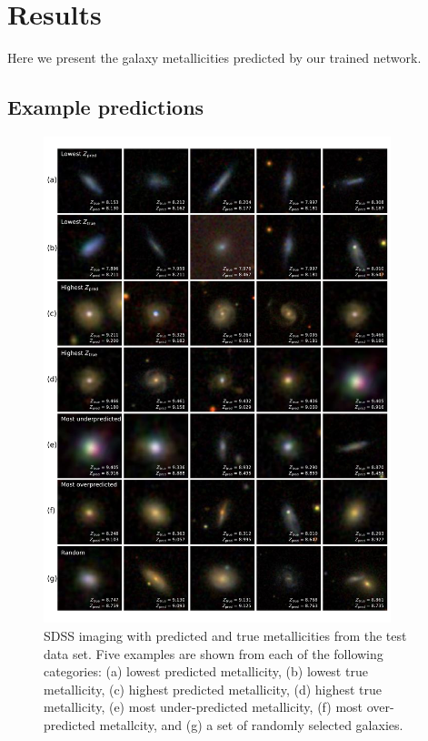 \documentclass[fleqn,usenatbib]{mnras}
\begin{document}
\section{Results}\label{sec:results}
Here we present the galaxy metallicities predicted by our trained network.

\subsection{Example predictions}
\begin{figure}
	\includegraphics[width=0.9\textwidth]{01-prediction_examples.pdf}
	\caption{\label{fig:examples}
		SDSS imaging with predicted and true metallicities from the test data set. Five examples are shown from each of the following categories: (a) lowest predicted metallicity, (b) lowest true metallicity, (c) highest predicted metallicity, (d) highest true metallicity, (e) most under-predicted metallicity, (f) most over-predicted metallcity, and (g) a set of randomly selected galaxies.}
\end{figure}
\end{document}
